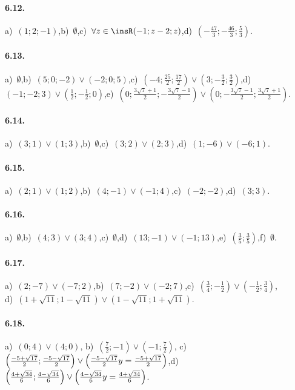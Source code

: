 \paragraph{6.12.} a)~$\left(1;2;-1\right)$,\quad b)~$\emptyset $,\quad c)~$\forall z \in \insR (-1;z-2;z)$,\quad d)~$\left(-\frac{47} 3;-\frac{46} 3;\frac 5 3\right)$.

\paragraph{6.13.} a)~$\emptyset $,\quad b)~$\left(5;0;-2\right)\vee \left(-2;0;5\right)$,\quad c)~$\left(-4;\frac{25} 2;\frac{17} 2\right)\vee \left(3;-\frac 3 2;\frac 3 2\right)$,\quad d)~$\left(-1;-2;3\right)\vee \left(\frac 1 2;-\frac 1 2;0\right)$,\quad e)~$\left(0;\frac{3\sqrt 7+1} 2;-\frac{3\sqrt 7-1} 2\right)\vee \left(0;-\frac{3\sqrt 7-1} 2;\frac{3\sqrt 7+1} 2\right)$.

\paragraph{6.14.} a)~$(3;1)\vee(1;3)$,\quad b)~$\emptyset $,\quad c)~$(3;2)\vee(2;3)$,\quad d)~$(1;-6)\vee(-6;1)$.

\paragraph{6.15.} a)~$(2;1)\vee(1;2)$,\quad b)~$(4;-1)\vee(-1;4)$,\quad c)~$(-2;-2)$,\quad d)~$(3;3)$.

\paragraph{6.16.} a)~$\emptyset $,\quad b)~$(4;3)\vee(3;4)$,\quad c)~$\emptyset $,\quad d)~$(13;-1)\vee(-1;13)$,\quad e)~$\left(\frac 3 5;\frac 3 5\right)$,\quad f)~$\emptyset $.

\paragraph{6.17.} a)~$(2;-7)\vee(-7;2)$,\quad b)~$(7;-2)\vee(-2;7)$,\quad c)~$\left(\frac 3 4;-\frac 1 2\right)\vee\left(-\frac 1 2;\frac 3 4\right)$,\protect\\
\quad d)~$\left(1+\sqrt{11};1-\sqrt{11}\right)\vee\left(1-\sqrt{11};1+\sqrt{11}\right)$.

\paragraph{6.18.} a)~$(0;4)\vee(4;0)$,\; b)~$\left(\frac 7 2;-1\right)\vee\left(-1;\frac 7 2\right)$,\; c)~$\left(\frac{-5+\sqrt{17}} 2;\frac{-5-\sqrt{17}} 2\right)\vee \left(\frac{-5-\sqrt{17}} 2\\y=\frac{-5+\sqrt{17}} 2\right)$,\quad d)~$\left(\frac{4+\sqrt{34}} 6;\frac{4-\sqrt{34}} 6\right)\vee \left(\frac{4-\sqrt{34}} 6\\y=\frac{4+\sqrt{34}} 6\right)$.

